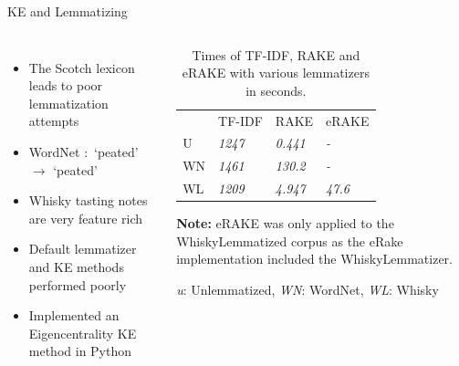 \documentclass{beamer}
\begin{document}
\begin{frame}{KE and Lemmatizing}
\begin{columns}[c] %
\begin{itemize}
    \item The Scotch lexicon leads to poor lemmatization attempts
    \item WordNet $:$ `peated' $\rightarrow$ `peated'
    \item Whisky tasting notes are very feature rich
    \item Default lemmatizer and KE methods performed poorly
    \item Implemented an Eigencentrality KE method in Python
\end{itemize}
        
\begin{table}
    \centering
    \begin{threeparttable}

        \caption{Times of TF-IDF, RAKE and eRAKE with various lemmatizers in seconds.}\label{tab:times}
        \begin{tabular}{llll} 
        \toprule
                           & TF-IDF        & RAKE           & eRAKE           \\
        U       & \textit{1247} & \textit{0.441} & \textit{-}      \\
        WN & \textit{1461} & \textit{130.2} & \textit{-}      \\
        WL   & \textit{1209} & \textit{4.947} & \textit{47.6}  \\
        \bottomrule
        \end{tabular}
        \begin{tablenotes}
            \small
            \item \textbf{Note:} eRAKE was only applied to the WhiskyLemmatized corpus
            as the eRake implementation included the WhiskyLemmatizer.
            \item \emph{u}: Unlemmatized, \emph{WN}: WordNet, \emph{WL}: Whisky
        \end{tablenotes}
    \end{threeparttable}
\end{table}
\end{columns}
\end{frame}
\end{document}
